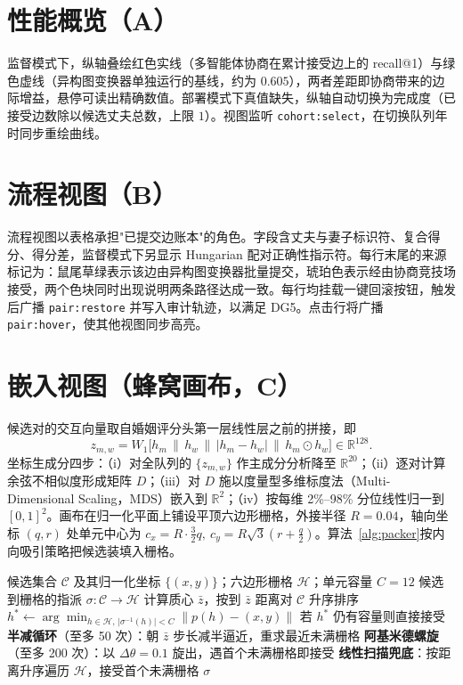 \section{性能概览（A）}\label{sec:vis-A}

监督模式下，纵轴叠绘红色实线（多智能体协商在累计接受边上的 recall@1）与绿色虚线（异构图变换器单独运行的基线，约为 $0.605$），两者差距即协商带来的边际增益，悬停可读出精确数值。部署模式下真值缺失，纵轴自动切换为完成度（已接受边数除以候选丈夫总数，上限 $1$）。视图监听 \texttt{cohort:select}，在切换队列年时同步重绘曲线。

\section{流程视图（B）}\label{sec:vis-B}

流程视图以表格承担"已提交边账本"的角色。字段含丈夫与妻子标识符、复合得分、得分差，监督模式下另显示 Hungarian 配对正确性指示符。每行末尾的来源标记为：鼠尾草绿表示该边由异构图变换器批量提交，琥珀色表示经由协商竞技场接受，两个色块同时出现说明两条路径达成一致。每行均挂载一键回滚按钮，触发后广播 \texttt{pair:restore} 并写入审计轨迹，以满足 DG5。点击行将广播 \texttt{pair:hover}，使其他视图同步高亮。

\section{嵌入视图（蜂窝画布，C）}\label{sec:vis-C}

候选对的交互向量取自婚姻评分头第一层线性层之前的拼接，即
\[
    z_{m,w} = W_1\bigl[h_m\,\|\,h_w\,\|\,|h_m-h_w|\,\|\,h_m\odot h_w\bigr]\in\mathbb{R}^{128}.
\]
坐标生成分四步：（i）对全队列的 $\{z_{m,w}\}$ 作主成分分析降至 $\mathbb{R}^{20}$；（ii）逐对计算余弦不相似度形成矩阵 $D$；（iii）对 $D$ 施以度量型多维标度法（Multi-Dimensional Scaling，MDS）嵌入到 $\mathbb{R}^2$；（iv）按每维 2\%--98\% 分位线性归一到 $[0,1]^2$。画布在归一化平面上铺设平顶六边形栅格，外接半径 $R=0.04$，轴向坐标 $(q,r)$ 处单元中心为 $c_x=R\cdot\tfrac{3}{2}q,\ c_y=R\sqrt{3}(r+\tfrac{q}{2})$。算法~\ref{alg:packer}按内向吸引策略把候选装填入栅格。

\begin{algorithm}[!htbp]
    \small
    \caption{蜂窝画布内向吸引装填}\label{alg:packer}
    \begin{algorithmic}[1]
        \Require 候选集合 $\mathcal{C}$ 及其归一化坐标 $\{(x,y)\}$；六边形栅格 $\mathcal{H}$；单元容量 $C=12$
        \Ensure 候选到栅格的指派 $\sigma:\mathcal{C}\to\mathcal{H}$
        \State 计算质心 $\bar{z}$，按到 $\bar{z}$ 距离对 $\mathcal{C}$ 升序排序
            \State $h^*\leftarrow\arg\min_{h\in\mathcal{H},\,|\sigma^{-1}(h)|<C}\|p(h)-(x,y)\|$
            \State 若 $h^*$ 仍有容量则直接接受
            \State \textbf{半减循环}（至多 50 次）：朝 $\bar{z}$ 步长减半逼近，重求最近未满栅格
            \State \textbf{阿基米德螺旋}（至多 200 次）：以 $\Delta\theta=0.1$ 旋出，遇首个未满栅格即接受
            \State \textbf{线性扫描兜底}：按距离升序遍历 $\mathcal{H}$，接受首个未满栅格
        \EndFor
        \State \Return $\sigma$
    \end{algorithmic}
\end{algorithm}

